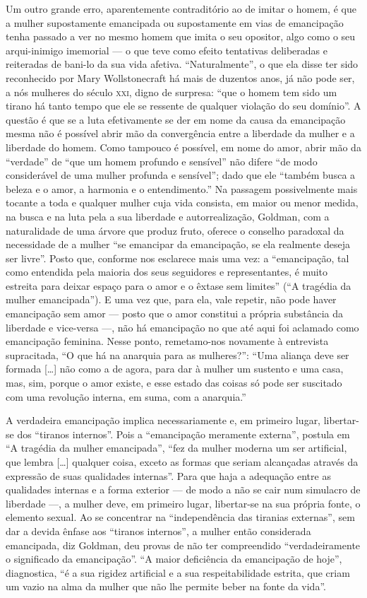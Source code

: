 Um outro grande erro, aparentemente contraditório ao de imitar o homem,
é que a mulher supostamente emancipada ou supostamente em vias de
emancipação tenha passado a ver no mesmo homem que imita o seu opositor,
algo como o seu arqui-inimigo imemorial --- o que teve como efeito
tentativas deliberadas e reiteradas de bani-lo da sua vida afetiva.
``Naturalmente'', o que ela disse ter sido reconhecido por Mary
Wollstonecraft há mais de duzentos anos, já não pode ser, a nós mulheres
do século \textsc{xxi}, digno de surpresa: ``que o homem tem sido um tirano há
tanto tempo que ele se ressente de qualquer violação do seu domínio''. A
questão é que se a luta efetivamente se der em nome da causa da
emancipação mesma não é possível abrir mão da convergência entre a
liberdade da mulher e a liberdade do homem. Como tampouco é possível, em
nome do amor, abrir mão da ``verdade'' de ``que um homem profundo e
sensível'' não difere ``de modo considerável de uma mulher profunda e
sensível''; dado que ele ``também busca a beleza e o amor, a harmonia e
o entendimento.'' Na passagem possivelmente mais tocante a toda e
qualquer mulher cuja vida consista, em maior ou menor medida, na busca e
na luta pela a sua liberdade e autorrealização, Goldman, com a
naturalidade de uma árvore que produz fruto, oferece o conselho
paradoxal da necessidade de a mulher ``se emancipar da emancipação, se
ela realmente deseja ser livre''. Posto que, conforme nos esclarece mais
uma vez: a ``emancipação, tal como entendida pela maioria dos seus
seguidores e representantes, é muito estreita para deixar espaço para o
amor e o êxtase sem limites'' (``A tragédia da mulher emancipada''). E
uma vez que, para ela, vale repetir, não pode haver emancipação sem amor
--- posto que o amor constitui a própria substância da liberdade e
vice-versa ---, não há emancipação no que até aqui foi aclamado como
emancipação feminina. Nesse ponto, remetamo-nos novamente à entrevista
supracitada, ``O que há na anarquia para as mulheres?'': ``Uma aliança
deve ser formada {[}\ldots{]} não como a de agora, para dar à mulher um
sustento e uma casa, mas, sim, porque o amor existe, e esse estado das
coisas só pode ser suscitado com uma revolução interna, em suma, com a
anarquia.''

A verdadeira emancipação implica necessariamente e, em primeiro lugar,
libertar-se dos ``tiranos internos''. Pois a ``emancipação meramente
externa'', postula em ``A tragédia da mulher emancipada'', ``fez da
mulher moderna um ser artificial, que lembra {[}\ldots{]} qualquer coisa,
exceto as formas que seriam alcançadas através da expressão de suas
qualidades internas''. Para que haja a adequação entre as qualidades
internas e a forma exterior --- de modo a não se cair num simulacro de
liberdade ---, a mulher deve, em primeiro lugar, libertar-se na sua
própria fonte, o elemento sexual. Ao se concentrar na ``independência
das tiranias externas'', sem dar a devida ênfase aos ``tiranos
internos'', a mulher então considerada emancipada, diz Goldman, deu
provas de não ter compreendido ``verdadeiramente o significado da
emancipação''. ``A maior deficiência da emancipação de hoje'',
diagnostica, ``é a sua rigidez artificial e a sua respeitabilidade
estrita, que criam um vazio na alma da mulher que não lhe permite beber
na fonte da vida''.

